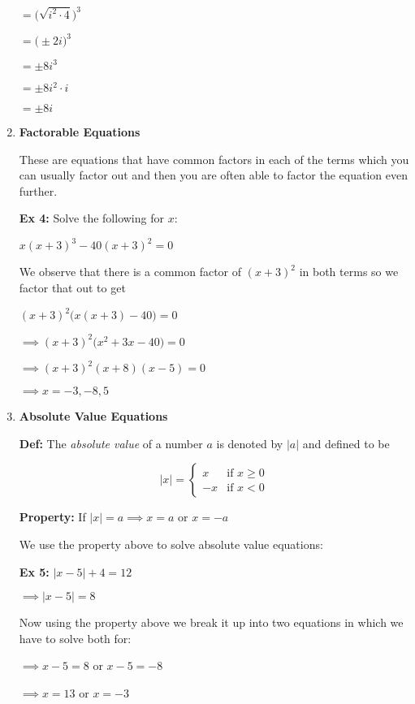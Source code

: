 \documentclass[12pt]{article}
\begin{document}
\begin{enumerate}
\hspace{4.5cm} $= \Big(\sqrt{i^2\cdot 4}\Big)^{3}$

\hspace{4.5cm} $= \Big(\pm 2i\Big)^{3}$ 

\hspace{4.5cm} $= \pm 8i^3$ 

\hspace{4.5cm} $= \pm 8i^2 \cdot i$

\hspace{4.5cm} $ = \pm 8i$
\item \textbf{Factorable Equations}

These are equations that have common factors in each of the terms which you can usually factor out and then you are often able to factor the equation even further. 

\textbf{Ex 4:} Solve the following for $x$:
\newline

\centerline{$x(x+3)^{3} - 40(x+3)^{2} = 0$}

We observe that there is a common factor of $(x+3)^{2}$ in both terms so we factor that out to get

$(x+3)^{2} \Big(x(x+3) - 40\Big) = 0$

$\implies (x+3)^{2} \Big(x^{2}+3x - 40\Big) = 0$

$\implies (x+3)^{2}(x+8)(x-5) = 0$

$\implies x = -3, -8, 5$

\item \textbf{Absolute Value Equations}

\textbf{Def:} The \textit{absolute value} of a number $a$ is denoted by $|a|$ and defined to be 

\abovedisplayskip=0pt\relax
\[
\lvert x \rvert =
\begin{cases}
x & \text{if } x \geq0\\
-x& \text{if } x<0
\end{cases}
\]

\textbf{Property:} If $|x| = a \implies x = a$ or $x = -a$

We use the property above to solve absolute value equations:

\textbf{Ex 5:} $|x-5| + 4 = 12$

$\implies |x-5| = 8$

Now using the property above we break it up into two equations in which we have to solve both for:

$\implies x - 5 = 8$ \hspace{1cm} or \hspace{1cm} $x - 5 = -8$

$\implies x  = 13$ \hspace{1.5cm} or \hspace{1cm} $x = -3$

\end{enumerate}
\end{document}
